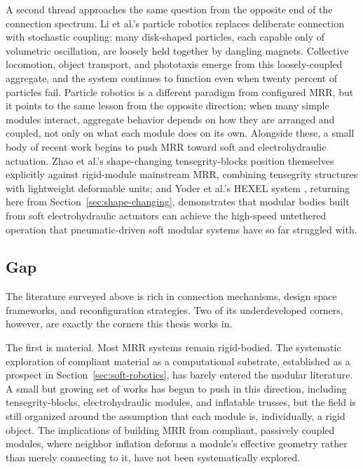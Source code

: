 A second thread approaches the same question from the opposite end of the connection spectrum. Li et al.'s particle robotics \cite{liParticleRoboticsBased2019} replaces deliberate connection with stochastic coupling: many disk-shaped particles, each capable only of volumetric oscillation, are loosely held together by dangling magnets. Collective locomotion, object transport, and phototaxis emerge from this loosely-coupled aggregate, and the system continues to function even when twenty percent of particles fail. Particle robotics is a different paradigm from configured MRR, but it points to the same lesson from the opposite direction: when many simple modules interact, aggregate behavior depends on how they are arranged and coupled, not only on what each module does on its own. Alongside these, a small body of recent work begins to push MRR toward soft and electrohydraulic actuation. Zhao et al.'s shape-changing tensegrity-blocks \cite{zhao_modular_2025} position themselves explicitly against rigid-module mainstream MRR, combining tensegrity structures with lightweight deformable units; and Yoder et al.'s HEXEL system \cite{yoderHexagonalElectrohydraulicModules2024}, returning here from Section~\ref{sec:shape-changing}, demonstrates that modular bodies built from soft electrohydraulic actuators can achieve the high-speed untethered operation that pneumatic-driven soft modular systems have so far struggled with.

\subsection{Gap}
\label{subsec:mrr-gap}

The literature surveyed above is rich in connection mechanisms, design space frameworks, and reconfiguration strategies. Two of its underdeveloped corners, however, are exactly the corners this thesis works in.

The first is material. Most MRR systems remain rigid-bodied. The systematic exploration of compliant material as a computational substrate, established as a prospect in Section~\ref{sec:soft-robotics}, has barely entered the modular literature. A small but growing set of works has begun to push in this direction, including tensegrity-blocks, electrohydraulic modules, and inflatable trusses, but the field is still organized around the assumption that each module is, individually, a rigid object. The implications of building MRR from compliant, passively coupled modules, where neighbor inflation deforms a module's effective geometry rather than merely connecting to it, have not been systematically explored.

